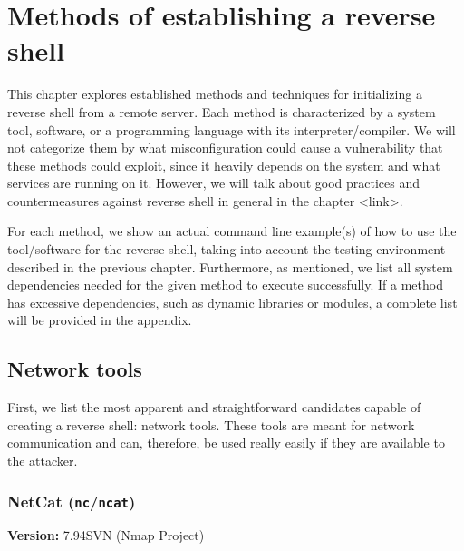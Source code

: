 \newcommand{\commandpath}[1]{chapters/chapter3/commands/#1}
\newcommand{\dpd}[1]{\begin{adjustwidth}{10pt}{0pt}\small \textbf{Dependencies:} #1 \end{adjustwidth}}
\newcommand{\notte}[1]{\begin{adjustwidth}{10pt}{0pt} \small \textbf{Note:} #1 \end{adjustwidth}}
\newcommand{\version}[1]{\textbf{Version:} #1}

\chapter{Methods of establishing a reverse shell}
\label{chap:methods}

This chapter explores established methods and techniques for initializing a reverse shell from a remote server. Each method is characterized by a system tool, software, or a programming language with its interpreter/compiler. We will not categorize them by what misconfiguration could cause a vulnerability that these methods could exploit, since it heavily depends on the system and what services are running on it. However, we will talk about good practices and countermeasures against reverse shell in general in the chapter <link>.

For each method, we show an actual command line example(s) of how to use the tool/software for the reverse shell, taking into account the testing environment described in the previous chapter. Furthermore, as mentioned, we list all system dependencies needed for the given method to execute successfully. If a method has excessive dependencies, such as dynamic libraries or modules, a complete list will be provided in the appendix.


\section{Network tools}

First, we list the most apparent and straightforward candidates capable of creating a reverse shell: network tools. These tools are meant for network communication and can, therefore, be used really easily if they are available to the attacker.


\subsection{NetCat (\texttt{nc}/\texttt{ncat})}

\version{7.94SVN (Nmap Project)}

